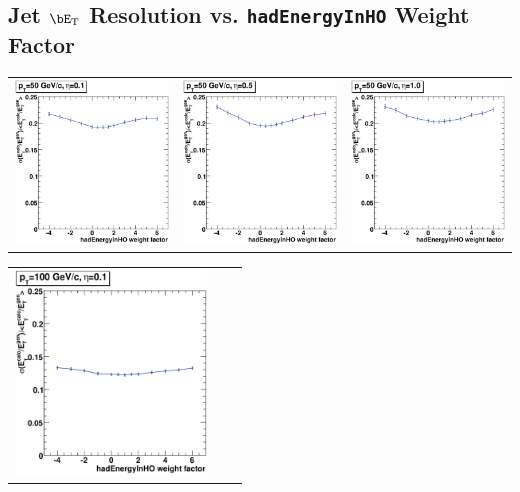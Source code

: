 \documentclass{cmspaper}
\begin{document}
\begin{appendices}
\section{Jet $\bE_\text T$ Resolution vs. \texttt{hadEnergyInHO} Weight Factor}
\label{app:res_vs_weight}

\begin{center}
\begin{tabular}{lll}
 \includegraphics[width=2in]{figs/ET_res_vs_HO_wght_eta0.1_pT50.eps} &
 \includegraphics[width=2in]{figs/ET_res_vs_HO_wght_eta0.5_pT50.eps} &
 \includegraphics[width=2in]{figs/ET_res_vs_HO_wght_eta1.0_pT50.eps} \\
\end{tabular}
\end{center}
\begin{center}
\begin{tabular}{lll}
 \includegraphics[width=2in]{figs/ET_res_vs_HO_wght_eta0.1_pT100.eps} &

\end{tabular}
\end{center}
\end{appendices}
\end{document}
